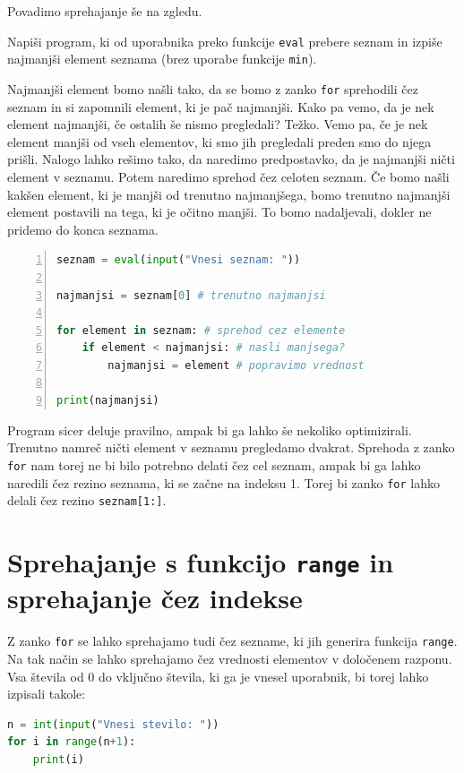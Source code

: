 Povadimo sprehajanje še na zgledu.
\begin{zgled}
Napiši program, ki od uporabnika preko funkcije \texttt{eval} prebere seznam in izpiše najmanjši element seznama (brez uporabe funkcije \texttt{min}). 
\end{zgled}
\begin{resitev}
Najmanjši element bomo našli tako, da se bomo z zanko \texttt{for} sprehodili čez seznam in si zapomnili element, ki je pač najmanjši. Kako pa vemo, da je nek element najmanjši, če ostalih še nismo pregledali? Težko. Vemo pa, če je nek element manjši od vseh elementov, ki smo jih pregledali preden smo do njega prišli. Nalogo lahko rešimo tako, da naredimo predpostavko, da je najmanjši ničti element v seznamu. Potem naredimo sprehod čez celoten seznam. Če bomo našli kakšen element, ki je manjši od trenutno najmanjšega, bomo trenutno najmanjši element postavili na tega, ki je očitno manjši. To bomo nadaljevali, dokler ne pridemo do konca seznama.
\begin{lstlisting}[language=Python,numbers=left]
seznam = eval(input("Vnesi seznam: "))

najmanjsi = seznam[0] # trenutno najmanjsi

for element in seznam: # sprehod cez elemente
    if element < najmanjsi: # nasli manjsega?
        najmanjsi = element # popravimo vrednost

print(najmanjsi)
\end{lstlisting}
Program sicer deluje pravilno, ampak bi ga lahko še nekoliko optimizirali. Trenutno namreč ničti element v seznamu pregledamo dvakrat. Sprehoda z zanko \texttt{for} nam torej ne bi bilo potrebno delati čez cel seznam, ampak bi ga lahko naredili čez rezino seznama, ki se začne na indeksu 1. Torej bi zanko \texttt{for} lahko delali čez rezino \texttt{seznam[1:]}.
\end{resitev}

\section{Sprehajanje s funkcijo \texttt{range} in sprehajanje čez indekse}

Z zanko \texttt{for} se lahko sprehajamo tudi čez sezname, ki jih generira funkcija \texttt{range}. Na tak način se lahko sprehajamo čez vrednosti elementov v določenem razponu. Vsa števila od 0 do vključno števila, ki ga je vnesel uporabnik, bi torej lahko izpisali takole:
\begin{lstlisting}[language=Python]
n = int(input("Vnesi stevilo: "))
for i in range(n+1):
    print(i)
\end{lstlisting}


